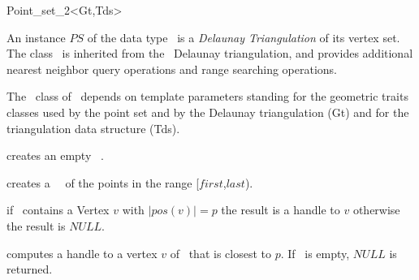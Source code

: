 \begin{ccRefClass}{Point_set_2<Gt,Tds>}

\ccDefinition


An instance $PS$ of the data type \ccRefName\  is a {\em Delaunay Triangulation}
of its vertex set. The class \ccRefName\ is inherited from the \cgal\ Delaunay triangulation,
and provides additional nearest neighbor query operations and range searching operations.

The \ccRefName\ class of \cgal\ depends on template parameters standing for the
geometric traits classes used by the point set and by the Delaunay triangulation (Gt)
and for the triangulation data structure (Tds). 




\ccHtmlLinksOff


\ccTypes
{}
\ccThreeToTwo
{}

\ccHtmlLinksOn


\ccCreation

{creates an empty \ccRefName\ .}


{creates a \ccRefName\ \ccVar\ of the points in the range
[$first$,$last$).}


\ccOperations


\ccHtmlLinksOff


{ if \ccVar\ contains a Vertex $v$ with $|pos(v)| = p$ 
the result is a handle to $v$ otherwise the result is $NULL$. }


{ computes a handle to a vertex $v$ of \ccVar\ that is closest to $p$.
If \ccVar\ is empty, $NULL$ is returned.
}


\end{ccRefClass}
